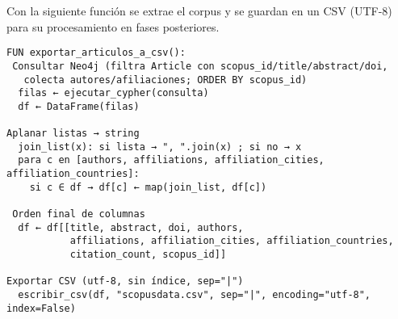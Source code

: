 Con la siguiente función se extrae el corpus y se guardan en un CSV (UTF-8) para su procesamiento en fases posteriores.
\begin{verbatim}
FUN exportar_articulos_a_csv():
 Consultar Neo4j (filtra Article con scopus_id/title/abstract/doi,
   colecta autores/afiliaciones; ORDER BY scopus_id)
  filas ← ejecutar_cypher(consulta)
  df ← DataFrame(filas)

Aplanar listas → string
  join_list(x): si lista → ", ".join(x) ; si no → x
  para c en [authors, affiliations, affiliation_cities, affiliation_countries]:
    si c ∈ df → df[c] ← map(join_list, df[c])

 Orden final de columnas
  df ← df[[title, abstract, doi, authors,
           affiliations, affiliation_cities, affiliation_countries,
           citation_count, scopus_id]]

Exportar CSV (utf-8, sin índice, sep="|")
  escribir_csv(df, "scopusdata.csv", sep="|", encoding="utf-8", index=False)
\end{verbatim}


